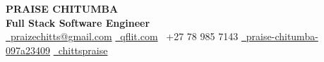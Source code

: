 \documentclass[10pt]{article}
\begin{document}
\color{Charcoal}

\begin{minipage}[t]{0.65\textwidth}
    {\Huge \textbf{\color{primary} PRAISE CHITUMBA}}\\[6pt]
    {\large \textbf{\color{primary} Full Stack Software Engineer}}\\[8pt]
    \small
    \href{mailto:praizechitts@gmail.com}{\faEnvelope\ \textcolor{primary}{praizechitts@gmail.com}} \quad
    \href{https://qflit.com}{\faGlobe\ \textcolor{primary}{qflit.com}} \quad
    {\faPhone\ +27 78 985 7143} \quad
    {} \quad
    \href{https://linkedin.com/in/praise-chitumba-097a23409}{\faLinkedin\ praise-chitumba-097a23409} \quad
    \href{https://github.com/chittspraise}{\faGithub\ chittspraise}
\end{minipage}

\vspace{0.5em}
\hdashrule{\textwidth}{0.5pt}{1pt}
\vspace{-0.5em}
\end{document}
